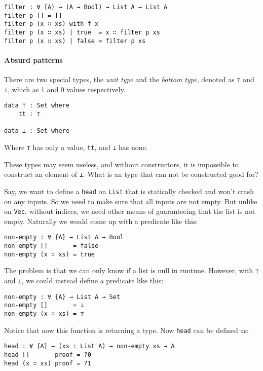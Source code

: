 \documentclass[12pt, a4paper]{article}
\begin{document}
\begin{lstlisting}
filter : ∀ {A} → (A → Bool) → List A → List A
filter p [] = []
filter p (x ∷ xs) with f x
filter p (x ∷ xs) | true  = x ∷ filter p xs
filter p (x ∷ xs) | false = filter p xs
\end{lstlisting}

\paragraph{Absurd patterns}

There are two special types, the \textit{unit type} and the \textit{bottom type},
denoted as {\lstinline|⊤|} and {\lstinline|⊥|}, which as 1 and 0 values respectively.

\begin{lstlisting}
data ⊤ : Set where
    tt : ⊤

data ⊥ : Set where
\end{lstlisting}

Where {\lstinline|⊤|} has only a value, {\lstinline|tt|}, and {\lstinline|⊥|} has none.

These types may seem useless, and without constructors, it is impossible to
construct an element of {\lstinline|⊥|}. What is an type that can not be
constructed good for?

Say, we want to define a {\lstinline|head|} on {\lstinline|List|} that is
statically checked and won't crash on any inputs. So we need to make sure that
all inputs are not empty. But unlike on {\lstinline|Vec|}, without indices, we
need other means of guaranteeing that the list is not empty. Naturally we would
come up with a predicate like this:

\begin{lstlisting}
non-empty : ∀ {A} → List A → Bool
non-empty []       = false
non-empty (x ∷ xs) = true
\end{lstlisting}

The problem is that we can only know if a list is null in runtime. However, with
 {\lstinline|⊤|} and {\lstinline|⊥|}, we could instead define a predicate like this:

\begin{lstlisting}
non-empty : ∀ {A} → List A → Set
non-empty []       = ⊥
non-empty (x ∷ xs) = ⊤
\end{lstlisting}

Notice that now this function is returning a type. Now {\lstinline|head|} can be
defined as:

\begin{lstlisting}
head : ∀ {A} → (xs : List A) → non-empty xs → A
head []       proof = ?0
head (x ∷ xs) proof = ?1
\end{lstlisting}
\end{document}
